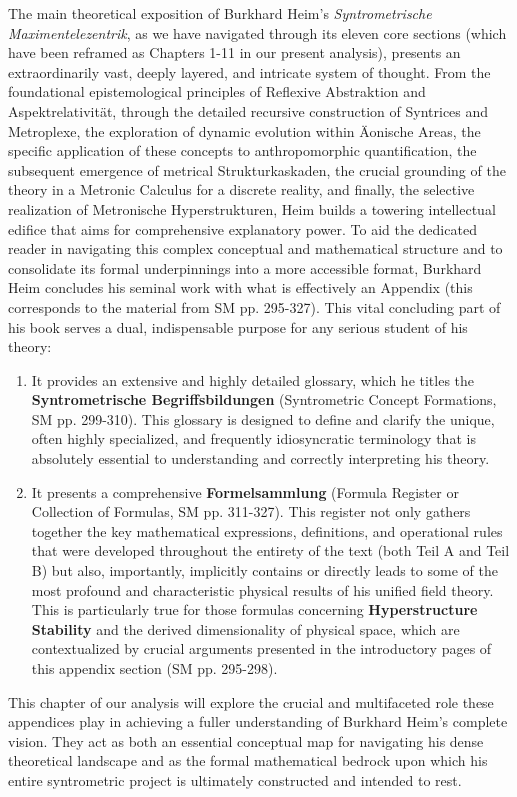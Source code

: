 \documentclass[
    12pt,              %
    a4paper,           %
    headings=normal,   %
    twoside=true,      %
    BCOR=8mm,          %
]{scrbook}
\begin{document}
The main theoretical exposition of Burkhard Heim's \textit{Syntrometrische Maximentelezentrik}, as we have navigated through its eleven core sections (which have been reframed as Chapters 1-11 in our present analysis), presents an extraordinarily vast, deeply layered, and intricate system of thought. From the foundational epistemological principles of Reflexive Abstraktion and Aspektrelativität, through the detailed recursive construction of Syntrices and Metroplexe, the exploration of dynamic evolution within Äonische Areas, the specific application of these concepts to anthropomorphic quantification, the subsequent emergence of metrical Strukturkaskaden, the crucial grounding of the theory in a Metronic Calculus for a discrete reality, and finally, the selective realization of Metronische Hyperstrukturen, Heim builds a towering intellectual edifice that aims for comprehensive explanatory power. To aid the dedicated reader in navigating this complex conceptual and mathematical structure and to consolidate its formal underpinnings into a more accessible format, Burkhard Heim concludes his seminal work with what is effectively an Appendix (this corresponds to the material from SM pp. 295-327). This vital concluding part of his book serves a dual, indispensable purpose for any serious student of his theory:

\begin{enumerate}
    \item It provides an extensive and highly detailed glossary, which he titles the \textbf{Syntrometrische Begriffsbildungen} (Syntrometric Concept Formations, SM pp. 299-310). This glossary is designed to define and clarify the unique, often highly specialized, and frequently idiosyncratic terminology that is absolutely essential to understanding and correctly interpreting his theory.
    \item It presents a comprehensive \textbf{Formelsammlung} (Formula Register or Collection of Formulas, SM pp. 311-327). This register not only gathers together the key mathematical expressions, definitions, and operational rules that were developed throughout the entirety of the text (both Teil A and Teil B) but also, importantly, implicitly contains or directly leads to some of the most profound and characteristic physical results of his unified field theory. This is particularly true for those formulas concerning \textbf{Hyperstructure Stability} and the derived dimensionality of physical space, which are contextualized by crucial arguments presented in the introductory pages of this appendix section (SM pp. 295-298).
\end{enumerate}
This chapter of our analysis will explore the crucial and multifaceted role these appendices play in achieving a fuller understanding of Burkhard Heim's complete vision. They act as both an essential conceptual map for navigating his dense theoretical landscape and as the formal mathematical bedrock upon which his entire syntrometric project is ultimately constructed and intended to rest.
\end{document}
